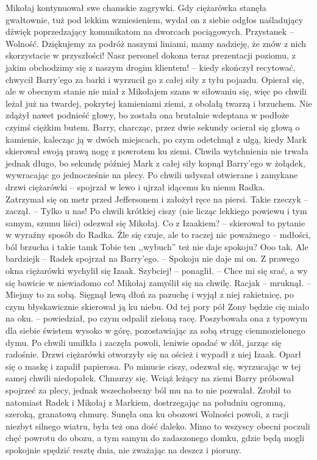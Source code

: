 \documentclass[../MAIN.tex]{subfiles}
\begin{document}
Mikołaj kontynuował swe chamskie zagrywki. Gdy ciężarówka stanęła gwałtownie, tuż pod lekkim wzniesieniem, wydał on z siebie odgłos naśladujący dźwięk poprzedzający komunikatom na dworcach pociągowych.
\sx Przystanek -- Wolność. Dziękujemy za podróż naszymi liniami, mamy nadzieję, że znów z nich skorzystacie w przyszłości! Nasz personel dokona teraz prezentacji poziomu, z jakim obchodzimy się z naszym drogim klientem! -- kiedy skończył recytować, chwycił Barry’ego za barki i wyrzucił go z całej siły z tyłu pojazdu. 
\qd
Opierał się, ale w obecnym stanie nie miał z Mikołajem szans w siłowaniu się, więc po chwili leżał już na twardej, pokrytej kamieniami ziemi, z obolałą twarzą i brzuchem. Nie zdążył nawet podnieść głowy, bo została ona brutalnie wdeptana w podłoże czyimś ciężkim butem. Barry, charcząc, przez dwie sekundy ocierał się głową o kamienie, kalecząc ją w dwóch miejscach, po czym odetchnął z ulgą, kiedy Mark skierował swoją prawą nogę z powrotem ku ziemi. Chwila wytchnienia nie trwała jednak długo, bo sekundę później Mark z całej siły kopnął Barry’ego w żołądek, wywracając go jednocześnie na plecy. Po chwili usłyszał otwierane i zamykane drzwi ciężarówki -- spojrzał w lewo i ujrzał idącemu ku niemu Radka.\\
Zatrzymał się on metr przed Jeffersonem i założył ręce na piersi.
\sx Takie rzeczy\3k -- zaczął. -- Tylko u nas!
\qd
Po chwili krótkiej ciszy (nie licząc lekkiego powiewu i tym samym, szumu liści) odezwał się Mikołaj.
\sx Co z Izaakiem? -- skierował to pytanie w wyraźny sposób do Radka.
\xx Źle się czuje, ale to raczej nic poważnego -- mdłości, ból brzucha i takie tam\3k
\xx Tobie ten ,,wybuch'' też nie daje spokoju?
\xx Ooo tak. Ale bardziej\3k -- Radek spojrzał na Barry’ego. -- Spokoju nie daje mi on.
\qd
Z prawego okna ciężarówki wychylił się Izaak.
\sx Szybciej! -- ponaglił. -- Chce mi się srać, a wy się bawicie w niewiadomo co!
\qd
Mikołaj zamyślił się na chwilę.
\sx Racja\3k -- mruknął. -- Miejmy to za sobą.
\qd
Sięgnął lewą dłoń za pazuchę i wyjął z niej rakietnicę, po czym błyskawicznie skierował ją ku niebu.
\sx Od tej pory pół Zony będzie cię miało na oku. -- powiedział, po czym odpalił zieloną racę.
\qd
Poszybowała ona z typowym dla siebie świstem wysoko w górę, pozostawiając za sobą strugę ciemnozielonego dymu. Po chwili umilkła i zaczęła powoli, leniwie opadać w dół, jarząc się radośnie. Drzwi ciężarówki otworzyły się na oścież i wypadł z niej Izaak. Oparł się o maskę i zapalił papierosa. Po minucie ciszy, odezwał się, wyrzucając w tej samej chwili niedopałek.
\sx Chmurzy się.
\qd
Wciąż leżący na ziemi Barry próbował spojrzeć za plecy, jednak wszechobecny ból mu na to nie pozwalał. Zrobił to natomiast Radek i Mikołaj z Markiem, dostrzegając na południu ogromną, szeroką, granatową chmurę. Sunęła ona ku obozowi Wolności powoli, z racji niezbyt silnego wiatru, była też ona dość daleko. Mimo to wszyscy obecni poczuli chęć powrotu do obozu, a tym samym do zadaszonego domku, gdzie będą mogli spokojnie spędzić resztę dnia, nie zważając na deszcz i pioruny.\\
\end{document}
